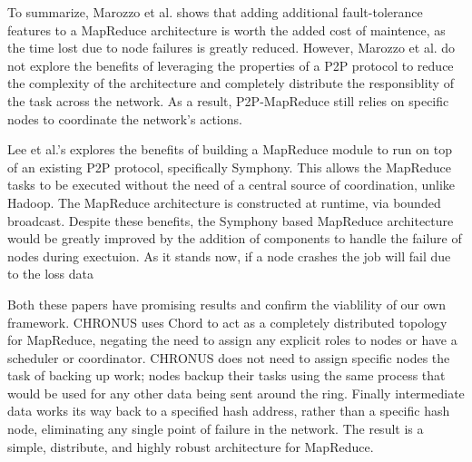 \documentclass[conference, compsocconf, letterpaper]{IEEEtran}
\begin{document}
To summarize, Marozzo et al. \cite{marozzo2012p2p} shows that adding additional fault-tolerance features to a MapReduce architecture is worth the added cost of maintence, as the time lost due to node failures is greatly reduced.  However, Marozzo et al. do not explore the benefits of leveraging the properties of a P2P protocol to reduce the complexity of the architecture and completely distribute the responsiblity of the task across the network.  As a result, P2P-MapReduce still relies on specific nodes to coordinate the network's actions.

Lee et al.'s \cite{leemap} explores the benefits of building a MapReduce module to run on top of an existing P2P protocol, specifically Symphony.  This allows the MapReduce tasks to be executed without the need of a central source of coordination, unlike Hadoop.  The MapReduce architecture is constructed at runtime, via bounded broadcast. Despite these benefits, the Symphony based MapReduce architecture would be greatly improved by the addition of components to handle the failure of nodes during exectuion.  As it stands now, if a node crashes the job will fail due to the loss data

Both these papers have promising results and confirm the viablility of our own framework.  CHRONUS uses Chord to act as a completely distributed topology for MapReduce, negating the need to assign any explicit roles to nodes or have a scheduler or coordinator.  CHRONUS does not need to assign specific nodes the task of backing up work; nodes backup their tasks using the same process that would be used for any other data being sent around the ring.  Finally intermediate data works its way back to a specified hash address, rather than a specific hash node, eliminating any single point of failure in the network.  The result is a simple, distribute, and highly robust architecture for MapReduce.
  




\end{document}
